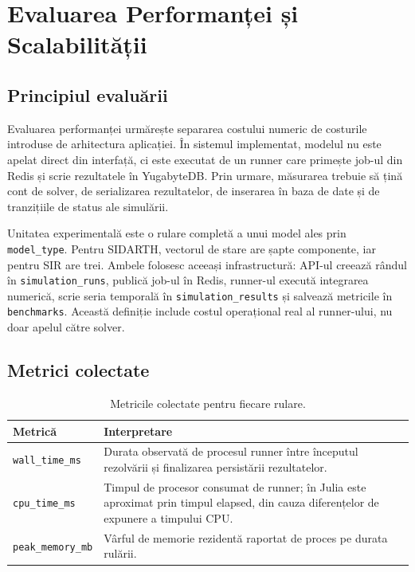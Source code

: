 
\chapter{Evaluarea Performanței și Scalabilității}
\label{ch:evaluare}

\section{Principiul evaluării}
\label{sec:metodologie_benchmark}

Evaluarea performanței urmărește separarea costului numeric de costurile
introduse de arhitectura aplicației. În sistemul implementat, modelul nu este
apelat direct din interfață, ci este executat de un runner care primește job-ul
din Redis și scrie rezultatele în YugabyteDB. Prin urmare, măsurarea trebuie să
țină cont de solver, de serializarea rezultatelor, de inserarea în baza de date
și de tranzițiile de status ale simulării.

Unitatea experimentală este o rulare completă a unui model ales prin
\texttt{model\_type}. Pentru SIDARTH, vectorul de stare are șapte componente, iar
pentru SIR are trei. Ambele folosesc aceeași infrastructură: API-ul creează
rândul în \texttt{simulation\_runs}, publică job-ul în Redis, runner-ul execută
integrarea numerică, scrie seria temporală în \texttt{simulation\_results} și
salvează metricile în \texttt{benchmarks}. Această definiție include costul
operațional real al runner-ului, nu doar apelul către solver.

\section{Metrici colectate}
\label{subsec:metrici}

\begin{table}[htbp]
\centering
\caption{Metricile colectate pentru fiecare rulare.}
\label{tab:metrici_benchmark}
\begin{tabular}{lp{9cm}}
\toprule
\textbf{Metrică} & \textbf{Interpretare} \\
\midrule
\texttt{wall\_time\_ms} & Durata observată de procesul runner între începutul rezolvării și finalizarea persistării rezultatelor. \\
\texttt{cpu\_time\_ms} & Timpul de procesor consumat de runner; în Julia este aproximat prin timpul elapsed, din cauza diferențelor de expunere a timpului CPU. \\
\texttt{peak\_memory\_mb} & Vârful de memorie rezidentă raportat de proces pe durata rulării. \\
\bottomrule
\end{tabular}
\end{table}

